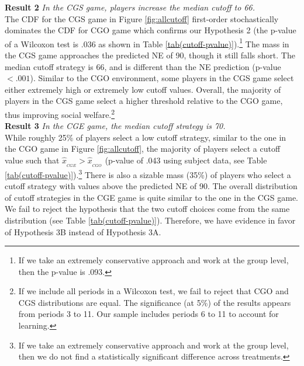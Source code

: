 \documentclass[12pt, letterpaper]{article}
\theoremstyle{plain}
\begin{document}
\noindent \textbf{Result 2}
\textit{In the CGS game, players increase the median cutoff to 66.}\\

The CDF for the CGS game in Figure \ref{fig:allcutoff} first-order stochastically dominates the CDF for CGO game which confirms our Hypothesis 2 (the p-value of a Wilcoxon test is .036 as shown in Table \ref{tab(cutoff-pvalue)}).\footnote{If we take an extremely conservative approach and work at the group level, then the p-value is .093.} The mass in the CGS game approaches the predicted NE of 90, though it still falls short. The median cutoff strategy is 66, and is different than the NE prediction (p-value $< .001$).  Similar to the CGO environment, some players in the CGS game select either extremely high or extremely low cutoff values. Overall, the majority of players in the CGS game select a higher threshold relative to the CGO game, thus improving social welfare.\footnote{If we include all periods in a Wilcoxon test, we fail to reject that CGO and CGS distributions are equal. The significance (at 5\%) of the results appears from periods 3 to 11. Our sample includes periods 6 to 11 to account for learning.}\\


\noindent \textbf{Result 3}
\textit{In the CGE game, the median cutoff strategy is 70.}\\

While roughly 25\% of players select a low cutoff strategy,  similar to the one in the CGO game in Figure \ref{fig:allcutoff}, the majority of players select a cutoff value such that $\hat{x}_{_{CGE}}> \hat{x}_{_{CGO}}$ (p-value of .043 using subject data, see Table \ref{tab(cutoff-pvalue)}).\footnote{If we take an extremely conservative approach and work at the group level, then we do not find a statistically significant difference across treatments.}  There is also a sizable mass (35\%) of players who select a cutoff strategy with values above the predicted NE of 90. The overall distribution of cutoff strategies in the CGE game is quite similar to the one in the CGS game. We fail to reject the hypothesis that the two cutoff choices come from the same distribution (see Table \ref{tab(cutoff-pvalue)}). Therefore, we have evidence in favor of Hypothesis 3B instead of Hypothesis 3A. 
\end{document}
